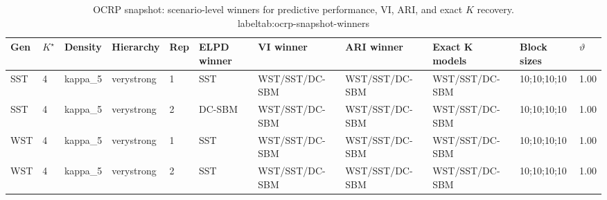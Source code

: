\begin{table}[!h]
\centering
\caption{OCRP snapshot: scenario-level winners for predictive performance, VI, ARI, and exact $K$ recovery.\\label{tab:ocrp-snapshot-winners}}
\centering
\begin{tabular}[t]{lllllllllll}
\toprule
Gen & $K^\star$ & Density & Hierarchy & Rep & ELPD winner & VI winner & ARI winner & Exact K models & Block sizes & $\vartheta$\\
\midrule
SST & 4 & kappa_5 & verystrong & 1 & SST & WST/SST/DC-SBM & WST/SST/DC-SBM & WST/SST/DC-SBM & 10;10;10;10 & 1.00\\
SST & 4 & kappa_5 & verystrong & 2 & DC-SBM & WST/SST/DC-SBM & WST/SST/DC-SBM & WST/SST/DC-SBM & 10;10;10;10 & 1.00\\
WST & 4 & kappa_5 & verystrong & 1 & SST & WST/SST/DC-SBM & WST/SST/DC-SBM & WST/SST/DC-SBM & 10;10;10;10 & 1.00\\
WST & 4 & kappa_5 & verystrong & 2 & SST & WST/SST/DC-SBM & WST/SST/DC-SBM & WST/SST/DC-SBM & 10;10;10;10 & 1.00\\
\bottomrule
\end{tabular}
\end{table}
